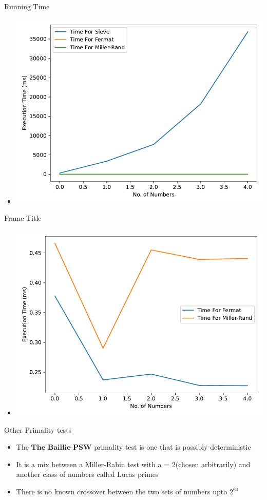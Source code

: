 \documentclass{beamer}
\begin{document}
\begin{frame}{Running Time}
    \begin{itemize}
        \item \includegraphics[width=\textwidth]{Fermat-Sieve-MillerRand.pdf}
    \end{itemize}
\end{frame}
\begin{frame}{Frame Title}
    \begin{itemize}
        \item \includegraphics[width=\textwidth]{Fermat-MillerRand.pdf}
    \end{itemize}
\end{frame}
\begin{frame}{Other Primality tests}
    \begin{itemize}
        \item The $\textbf{The Baillie-PSW}$ primality test is one that is possibly deterministic
        \item It is a mix between a Miller-Rabin test with a = 2(chosen arbitrarily) and another class of numbers called Lucas primes
        \item There is no known crossover between the two sets of numbers upto $2^{64}$
    \end{itemize}
\end{frame}
\end{document}
